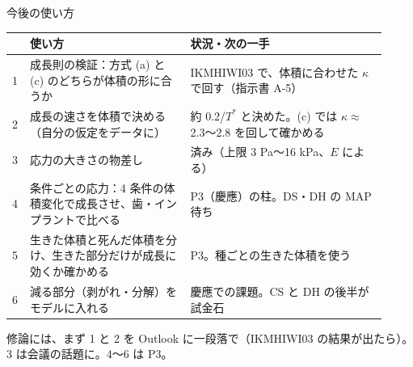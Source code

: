 \documentclass[aspectratio=169,11pt]{beamer}
\newcommand{\pt}[1]{\colorbox{c3!10}{\parbox{0.96\linewidth}{\small #1}}}
\begin{document}
\begin{frame}{今後の使い方}
\small
\begin{tabular}{@{}p{0.03\linewidth}p{0.4\linewidth}p{0.49\linewidth}@{}}
\toprule
& 使い方 & 状況・次の一手\\
\midrule
1 & 成長則の検証：方式 (a) と (c) のどちらが体積の形に合うか & IKMHIWI03 で、体積に合わせた $\kappa$ で回す（指示書 A-5）\\
2 & 成長の速さを体積で決める（自分の仮定をデータに） & 約 0.2/$T^*$ と決めた。(c) では $\kappa\approx$ 2.3〜2.8 を回して確かめる\\
3 & 応力の大きさの物差し & 済み（上限 3 Pa〜16 kPa、$E$ による）\\
4 & 条件ごとの応力：4 条件の体積変化で成長させ、歯・インプラントで比べる & P3（慶應）の柱。DS・DH の MAP 待ち\\
5 & 生きた体積と死んだ体積を分け、生きた部分だけが成長に効くか確かめる & P3。種ごとの生きた体積を使う\\
6 & 減る部分（剥がれ・分解）をモデルに入れる & 慶應での課題。CS と DH の後半が試金石\\
\bottomrule
\end{tabular}
\vspace{6pt}
\pt{修論には、まず 1 と 2 を Outlook に一段落で（IKMHIWI03 の結果が出たら）。3 は会議の話題に。4〜6 は P3。}
\end{frame}
\end{document}
